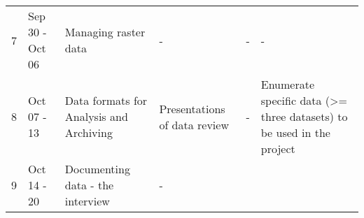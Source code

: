 \documentclass[
]{article}
\begin{document}
\begin{longtable}[]{@{}llllll@{}}
\begin{minipage}[t]{0.05\columnwidth}
7\strut
\end{minipage} & \begin{minipage}[t]{0.11\columnwidth}\raggedright
Sep 30 - Oct 06\strut
\end{minipage} & \begin{minipage}[t]{0.18\columnwidth}\raggedright
Managing raster data\strut
\end{minipage} & \begin{minipage}[t]{0.18\columnwidth}\raggedright
-\strut
\end{minipage} & \begin{minipage}[t]{0.14\columnwidth}\raggedright
-\strut
\end{minipage} & \begin{minipage}[t]{0.17\columnwidth}\raggedright
-\strut
\end{minipage}\tabularnewline
\begin{minipage}[t]{0.05\columnwidth}\raggedright
8\strut
\end{minipage} & \begin{minipage}[t]{0.11\columnwidth}\raggedright
Oct 07 - 13\strut
\end{minipage} & \begin{minipage}[t]{0.18\columnwidth}\raggedright
Data formats for Analysis and Archiving\strut
\end{minipage} & \begin{minipage}[t]{0.18\columnwidth}\raggedright
Presentations of data review\strut
\end{minipage} & \begin{minipage}[t]{0.14\columnwidth}\raggedright
-\strut
\end{minipage} & \begin{minipage}[t]{0.17\columnwidth}\raggedright
Enumerate specific data (\textgreater= three datasets) to be used in the
project\strut
\end{minipage}\tabularnewline
\begin{minipage}[t]{0.05\columnwidth}\raggedright
9\strut
\end{minipage} & \begin{minipage}[t]{0.11\columnwidth}\raggedright
Oct 14 - 20\strut
\end{minipage} & \begin{minipage}[t]{0.18\columnwidth}\raggedright
Documenting data - the interview\strut
\end{minipage} & \begin{minipage}[t]{0.18\columnwidth}\raggedright
-\strut
\end{minipage} & \begin{minipage}[t]{0.14\columnwidth}\raggedright

\end{minipage}
\end{longtable}
\end{document}
